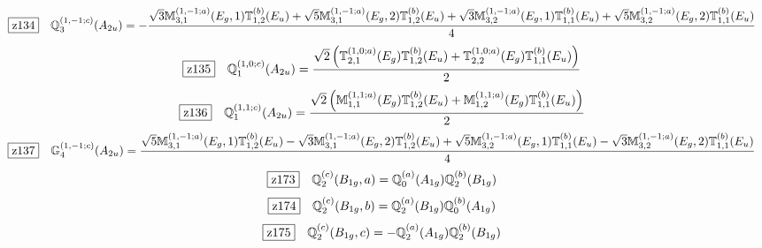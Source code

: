 \documentclass[fleqn,10pt,landscape]{jsarticle}
\begin{document}
\begin{dmath*}
\hspace*{3mm}\fbox{z134}\quad \mathbb{Q}_{3}^{(1,-1;c)}(A_{2u})=- \frac{\sqrt{3} \mathbb{M}_{3,1}^{(1,-1;a)}(E_{g},1) \mathbb{T}_{1,2}^{(b)}(E_{u}) + \sqrt{5} \mathbb{M}_{3,1}^{(1,-1;a)}(E_{g},2) \mathbb{T}_{1,2}^{(b)}(E_{u}) + \sqrt{3} \mathbb{M}_{3,2}^{(1,-1;a)}(E_{g},1) \mathbb{T}_{1,1}^{(b)}(E_{u}) + \sqrt{5} \mathbb{M}_{3,2}^{(1,-1;a)}(E_{g},2) \mathbb{T}_{1,1}^{(b)}(E_{u})}{4}
\end{dmath*}
\begin{dmath*}
\hspace*{3mm}\fbox{z135}\quad \mathbb{Q}_{1}^{(1,0;c)}(A_{2u})=\frac{\sqrt{2} \left(\mathbb{T}_{2,1}^{(1,0;a)}(E_{g}) \mathbb{T}_{1,2}^{(b)}(E_{u}) + \mathbb{T}_{2,2}^{(1,0;a)}(E_{g}) \mathbb{T}_{1,1}^{(b)}(E_{u})\right)}{2}
\end{dmath*}
\begin{dmath*}
\hspace*{3mm}\fbox{z136}\quad \mathbb{Q}_{1}^{(1,1;c)}(A_{2u})=\frac{\sqrt{2} \left(\mathbb{M}_{1,1}^{(1,1;a)}(E_{g}) \mathbb{T}_{1,2}^{(b)}(E_{u}) + \mathbb{M}_{1,2}^{(1,1;a)}(E_{g}) \mathbb{T}_{1,1}^{(b)}(E_{u})\right)}{2}
\end{dmath*}
\begin{dmath*}
\hspace*{3mm}\fbox{z137}\quad \mathbb{G}_{4}^{(1,-1;c)}(A_{2u})=\frac{\sqrt{5} \mathbb{M}_{3,1}^{(1,-1;a)}(E_{g},1) \mathbb{T}_{1,2}^{(b)}(E_{u}) - \sqrt{3} \mathbb{M}_{3,1}^{(1,-1;a)}(E_{g},2) \mathbb{T}_{1,2}^{(b)}(E_{u}) + \sqrt{5} \mathbb{M}_{3,2}^{(1,-1;a)}(E_{g},1) \mathbb{T}_{1,1}^{(b)}(E_{u}) - \sqrt{3} \mathbb{M}_{3,2}^{(1,-1;a)}(E_{g},2) \mathbb{T}_{1,1}^{(b)}(E_{u})}{4}
\end{dmath*}
\begin{dmath*}
\hspace*{3mm}\fbox{z173}\quad \mathbb{Q}_{2}^{(c)}(B_{1g},a)=\mathbb{Q}_{0}^{(a)}(A_{1g}) \mathbb{Q}_{2}^{(b)}(B_{1g})
\end{dmath*}
\begin{dmath*}
\hspace*{3mm}\fbox{z174}\quad \mathbb{Q}_{2}^{(c)}(B_{1g},b)=\mathbb{Q}_{2}^{(a)}(B_{1g}) \mathbb{Q}_{0}^{(b)}(A_{1g})
\end{dmath*}
\begin{dmath*}
\hspace*{3mm}\fbox{z175}\quad \mathbb{Q}_{2}^{(c)}(B_{1g},c)=- \mathbb{Q}_{2}^{(a)}(A_{1g}) \mathbb{Q}_{2}^{(b)}(B_{1g})
\end{dmath*}
\end{document}
